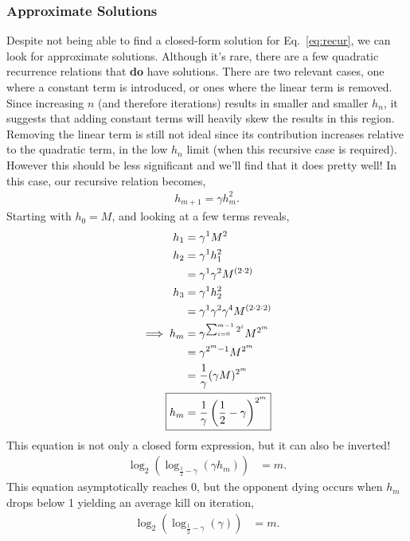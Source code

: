 \documentclass[../../main.tex]{subfiles}
\begin{document}
		\subsubsection{Approximate Solutions}
			Despite not being able to find a closed-form solution for Eq.~\ref{eq:recur}, we can look for approximate solutions. Although it's rare, there are a few quadratic recurrence relations that \textbf{do} have solutions. There are two relevant cases, one where a constant term is introduced, or ones where the linear term is removed. Since increasing $n$ (and therefore iterations) results in smaller and smaller $h_n$, it suggests that adding constant terms will heavily skew the results in this region. Removing the linear term is still not ideal since its contribution increases relative to the quadratic term, in the low $h_n$ limit (when this recursive case is required). However this should be less significant and we'll find that it does pretty well! In this case, our recursive relation becomes,
			\begin{align}
				h_{m+1} = \gamma h_m^2.
			\end{align}
			Starting with $h_0 = M$, and looking at a few terms reveals,
			\begin{align}
				h_{1} &= \gamma^1 M^2\\
				h_{2} &= \gamma^1 h_1^2\\
					&= \gamma^1 \gamma^2 M^{(2\cdot2)}\\
				h_{3} &= \gamma^1 h_2^2\\
					&= \gamma^1 \gamma^2 \gamma^4 M^{(2\cdot2\cdot2)}\\
				\implies h_m &= \gamma^{\sum_{i=0}^{m-1} 2^i} M^{2^m}\\
							&= \gamma^{2^m-1} M^{2^m}\\
							&= \frac{1}{\gamma}(\gamma M)^{2^m}\\
						\Aboxed{h_m &= \frac{1}{\gamma}\left(\frac{1}{2} - \gamma\right)^{2^m}}
			\end{align}
			This equation is not only a closed form expression, but it can also be inverted!
			\begin{align}
				\log_2(\log_{\frac{1}{2} - \gamma} (\gamma h_m)) &= m.
			\end{align}
			This equation asymptotically reaches 0, but the opponent dying occurs when $h_m$ drops below 1 yielding an average kill on iteration,
			\begin{align}
				\log_2(\log_{\frac{1}{2} - \gamma} (\gamma)) &= m.
			\end{align}
\end{document}
